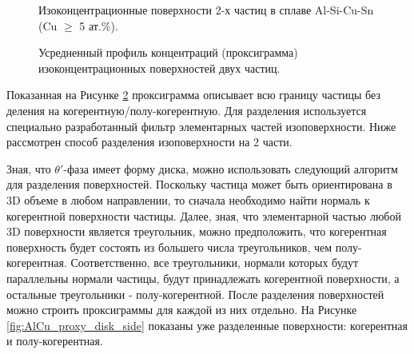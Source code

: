 \begin{figure}[htb]
	\caption{Изоконцентрационные поверхности 2-х частиц в сплаве Al-Si-Cu-Sn (Cu $\geq$ 5 ат.\%).}
	\label{fig:AlCu_iso}
\end{figure}


\begin{figure}[htb]
	\caption{Усредненный профиль концентраций (проксиграмма) изоконцентрационных поверхностей двух частиц.}
	\label{fig:AlCu_proxy_all}
\end{figure}

\FloatBarrier

Показанная на Рисунке \cref{fig:AlCu_proxy_all} проксиграмма описывает всю границу частицы без деления на когерентную/полу-когерентную. Для разделения используется специально разработанный фильтр элементарных частей изоповерхности. Ниже рассмотрен способ разделения изоповерхности на 2 части. 

Зная, что $\theta '$-фаза имеет форму диска, можно использовать следующий алгоритм для разделения поверхностей. Поскольку частица может быть ориентирована в 3D объеме в любом направлении, то сначала необходимо найти нормаль к когерентной поверхности частицы. Далее, зная, что элементарной частью любой 3D поверхности является треугольник, можно предположить, что когерентная поверхность будет состоять из большего числа треугольников, чем полу-когерентная. Соответственно, все треугольники, нормали которых будут параллельны нормали частицы, будут принадлежать когерентной поверхности, а остальные треугольники - полу-когерентной. После разделения поверхностей можно строить проксиграммы для каждой из них отдельно. На Рисунке \cref{fig:AlCu_proxy_disk_side} показаны уже разделенные поверхности: когерентная и полу-когерентная.


